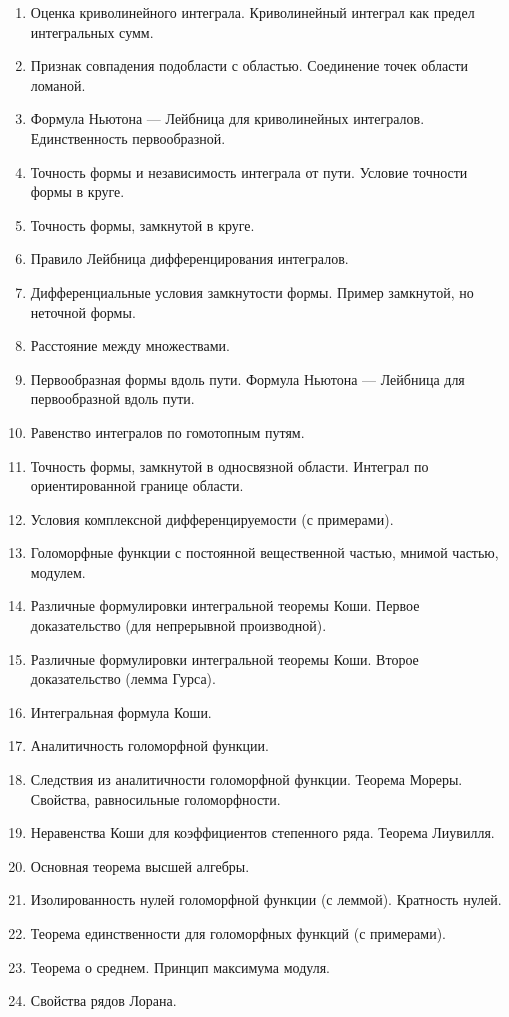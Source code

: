 \documentclass[12pt, a4paper, oneside]{memoir}
\begin{document}
\begin{enumerate}
\item Оценка криволинейного интеграла. Криволинейный интеграл как предел интегральных сумм.
\item Признак совпадения подобласти с областью. Соединение точек области ломаной.
\item Формула Ньютона — Лейбница для криволинейных интегралов. Единственность первообразной.
\item Точность формы и независимость интеграла от пути. Условие точности формы в круге.
\item Точность формы, замкнутой в круге.
\item Правило Лейбница дифференцирования интегралов.
\item Дифференциальные условия замкнутости формы. Пример замкнутой, но неточной формы.
\item Расстояние между множествами.
\item Первообразная формы вдоль пути. Формула Ньютона — Лейбница для первообразной вдоль пути.
\item Равенство интегралов по гомотопным путям.
\item Точность формы, замкнутой в односвязной области. Интеграл по ориентированной границе области.
\item Условия комплексной дифференцируемости (с примерами).
\item Голоморфные функции с постоянной вещественной частью, мнимой частью, модулем.
\item Различные формулировки интегральной теоремы Коши. Первое доказательство (для непрерывной производной).
\item Различные формулировки интегральной теоремы Коши. Второе доказательство (лемма Гурса).
\item Интегральная формула Коши.
\item Аналитичность голоморфной функции.
\item Следствия из аналитичности голоморфной функции. Теорема Мореры. Свойства, равносильные голоморфности.
\item Неравенства Коши для коэффициентов степенного ряда. Теорема Лиувилля.
\item Основная теорема высшей алгебры.
\item Изолированность нулей голоморфной функции (с леммой). Кратность нулей.
\item Теорема единственности для голоморфных функций (с примерами).
\item Теорема о среднем. Принцип максимума модуля.
\item Свойства рядов Лорана.

\end{enumerate}
\end{document}
